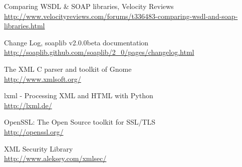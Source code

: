 \begin{thebibliography}{99}
Comparing WSDL & SOAP libraries, Velocity Reviews\\
\url{http://www.velocityreviews.com/forums/t336483-comparing-wsdl-and-soap-libraries.html}

Change Log, soaplib v2.0.0beta documentation\\
\url{http://soaplib.github.com/soaplib/2_0/pages/changelog.html}

The XML C parser and toolkit of Gnome\\
\url{http://www.xmlsoft.org/}

lxml - Processing XML and HTML with Python\\
\url{http://lxml.de/}

OpenSSL: The Open Source toolkit for SSL/TLS\\
\url{http://openssl.org/}

XML Security Library\\
\url{http://www.aleksey.com/xmlsec/}

\end{thebibliography}
